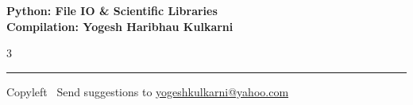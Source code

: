 \documentclass[8pt,landscape]{article}
\begin{document}
\footnotesize


\begin{center}
\Large{\textbf{Python: File IO \& Scientific Libraries\\ Compilation: Yogesh Haribhau Kulkarni}}
\end{center}

\begin{multicols}{3}

\end{multicols}

\rule{\linewidth}{0.25pt}
\scriptsize
Copyleft \textcopyleft\  Send suggestions to
\href{http://www.yogeshkulkarni.com}{yogeshkulkarni@yahoo.com}
\end{document}

